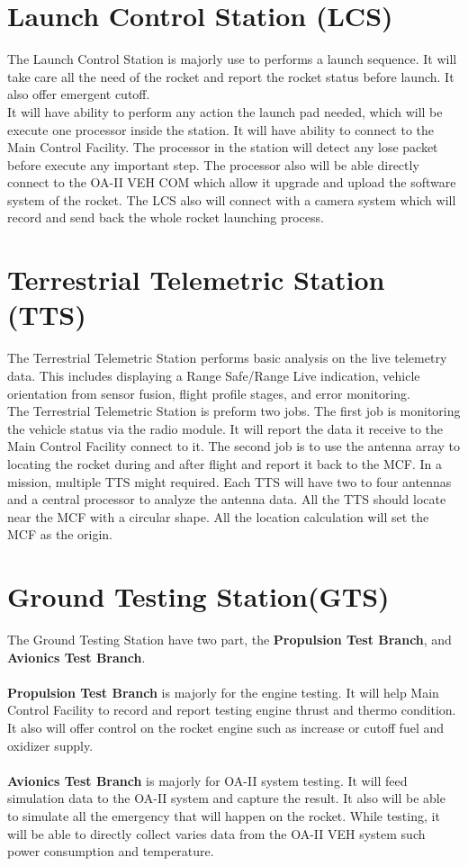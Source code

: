 \documentclass[12pt,article]{memoir}
\begin{document}
\section{Launch Control Station (LCS)}
The Launch Control Station is majorly use to performs a launch sequence. It will take care all the need of the rocket and report the rocket status before launch. It also offer emergent cutoff. \\
It will have ability to perform any action the launch pad needed, which will be execute one processor inside the station. It will have ability to connect to the Main Control Facility. The processor in the station will detect any lose packet before execute any important step. The processor also will be able directly connect to the OA-II VEH COM which allow it upgrade and upload the software system of the rocket. The LCS also will connect with a camera system which will record and send back the whole rocket launching process. 
\section{Terrestrial Telemetric Station (TTS)}
The Terrestrial Telemetric Station performs basic analysis on the live telemetry data. This includes displaying a Range Safe/Range Live indication, vehicle orientation from sensor fusion, flight profile stages, and error monitoring.\\
The Terrestrial Telemetric Station is preform two jobs. The first job is monitoring the vehicle status via the radio module. It will report the data it receive to the Main Control Facility connect to it. The second job is to use the antenna array to locating the rocket during and after flight and report it back to the MCF. In a mission, multiple TTS might required. Each TTS will have two to four antennas and a central processor to analyze the antenna data. All the TTS should locate near the MCF with a circular shape. All the location calculation will set the MCF as the origin.
\section{Ground Testing Station(GTS)}
The Ground Testing Station have two part, the \textbf{Propulsion Test Branch}, and \textbf{Avionics Test Branch}.\\\\
\textbf{Propulsion Test Branch} is majorly for the engine testing. It will help Main Control Facility to record and report testing engine thrust and thermo condition. It also will offer control on the rocket engine such as increase or cutoff fuel and oxidizer supply.\\\\
\textbf{Avionics Test Branch} is majorly for OA-II system testing. It will feed simulation data to the OA-II system and capture the result. It also will be able to simulate all the emergency that will happen on the rocket. While testing, it will be able to directly collect varies data from the OA-II VEH system such power consumption and temperature.

\end{document}
